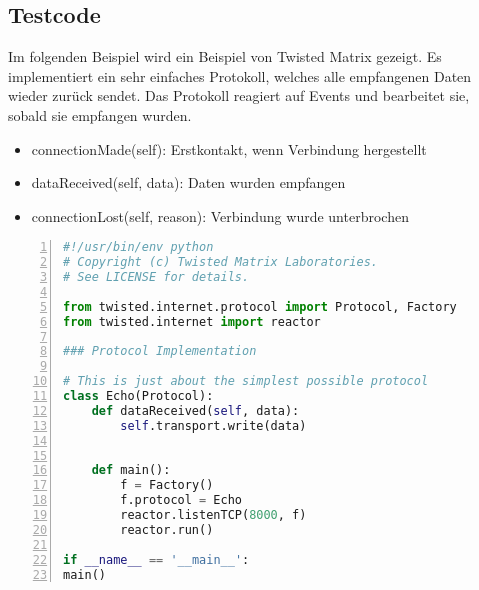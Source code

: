\subsection{Testcode}
Im folgenden Beispiel wird ein Beispiel von Twisted Matrix gezeigt. Es implementiert ein sehr einfaches Protokoll, welches alle empfangenen Daten wieder zurück sendet. Das Protokoll reagiert auf Events und bearbeitet sie, sobald sie empfangen wurden. 
\begin{itemize}
\item connectionMade(self): Erstkontakt, wenn Verbindung hergestellt
\item dataReceived(self, data): Daten wurden empfangen
\item connectionLost(self, reason): Verbindung wurde unterbrochen
\end{itemize}
\begin{lstlisting}[caption =Testcode Echoserver mit Twisted Framework, language=python, frame=single, breaklines=true,columns=fullflexible, commentstyle=\color{gray}\upshape, captionpos=b, numbers = left]
#!/usr/bin/env python
# Copyright (c) Twisted Matrix Laboratories.
# See LICENSE for details.

from twisted.internet.protocol import Protocol, Factory
from twisted.internet import reactor

### Protocol Implementation

# This is just about the simplest possible protocol
class Echo(Protocol):
	def dataReceived(self, data):
		self.transport.write(data)


	def main():
		f = Factory()
		f.protocol = Echo
		reactor.listenTCP(8000, f)
		reactor.run()

if __name__ == '__main__':
main()
\end{lstlisting}




